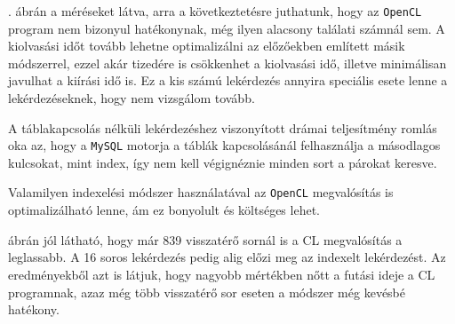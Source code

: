 . ábrán a méréseket látva, arra a következtetésre juthatunk, hogy az \texttt{OpenCL} program nem bizonyul hatékonynak, még ilyen alacsony találati számnál sem. A kiolvasási időt tovább lehetne optimalizálni az előzőekben említett másik módszerrel, ezzel akár tizedére is csökkenhet a kiolvasási idő, illetve minimálisan javulhat a kiírási idő is. Ez a kis számú lekérdezés annyira speciális esete lenne a lekérdezéseknek, hogy nem vizsgálom tovább.

A táblakapcsolás nélküli lekérdezéshez viszonyított drámai teljesítmény romlás oka az, hogy a \texttt{MySQL} motorja a táblák kapcsolásánál felhasználja a másodlagos kulcsokat, mint index, így nem kell végignéznie minden sort a párokat keresve.

Valamilyen indexelési módszer használatával az \texttt{OpenCL} megvalósítás is optimalizálható lenne, ám ez bonyolult és költséges lehet.

 ábrán jól látható, hogy már 839 visszatérő sornál is a CL megvalósítás a leglassabb. A 16 soros lekérdezés pedig alig előzi meg az indexelt lekérdezést.
Az eredményekből azt is látjuk, hogy nagyobb mértékben nőtt a futási ideje a CL programnak, azaz még több visszatérő sor eseten a módszer még kevésbé hatékony.
